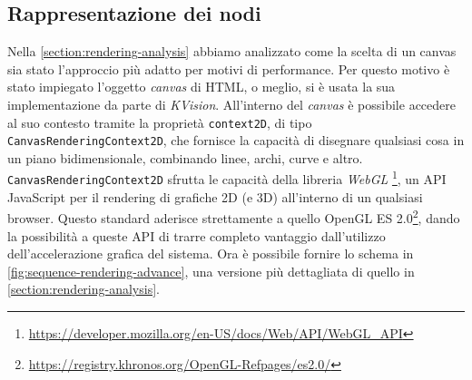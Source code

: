\subsection{Rappresentazione dei nodi}\label{subsection:node-representation}
Nella \cref{section:rendering-analysis} abbiamo analizzato come la scelta di un canvas sia stato l'approccio più adatto per motivi di performance. Per questo motivo è stato impiegato l'oggetto \textit{canvas} di HTML, o meglio, si è usata la sua implementazione da parte di \textit{KVision}. All'interno del \textit{canvas} è possibile accedere al suo contesto tramite la proprietà \texttt{context2D}, di tipo \texttt{CanvasRenderingContext2D}, che fornisce la capacità di disegnare qualsiasi cosa in un piano bidimensionale, combinando linee, archi, curve e altro. \texttt{CanvasRenderingContext2D} sfrutta le capacità della libreria \textit{WebGL} \footnote{\url{https://developer.mozilla.org/en-US/docs/Web/API/WebGL_API}}, un \ac{API} JavaScript per il rendering di grafiche 2D (e 3D) all'interno di un qualsiasi browser. Questo standard aderisce strettamente a quello OpenGL ES 2.0\footnote{\url{https://registry.khronos.org/OpenGL-Refpages/es2.0/}}, dando la possibilità a queste \ac{API} di trarre completo vantaggio dall'utilizzo dell'accelerazione grafica del sistema.
Ora è possibile fornire lo schema in \cref{fig:sequence-rendering-advance}, una versione più dettagliata di quello in \cref{section:rendering-analysis}. 

